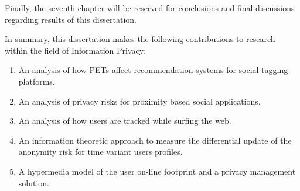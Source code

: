 Finally, the seventh chapter will be reserved for conclusions and final discussions regarding results of this dissertation.

In summary, this dissertation makes the following contributions to research within the field of Information Privacy:

\begin{enumerate}
    \item An analysis of how PETs affect recommendation systems for social tagging platforms.
    \item An analysis of privacy risks for proximity based social applications.
    \item An analysis of how users are tracked while surfing the web.
    \item An information theoretic approach to measure the differential update of the anonymity risk for time variant users profiles.
    \item A hypermedia model of the user on-line footprint and a privacy management solution.
\end{enumerate}